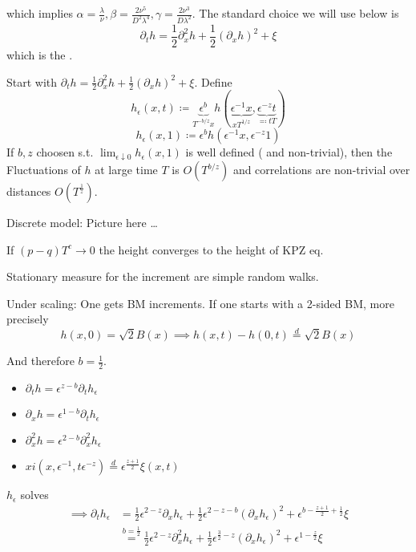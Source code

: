 which implies $\alpha=\frac{\lambda}{\nu},\beta=\frac{2\nu^5}{D^2\lambda^4},\gamma=\frac{2\nu^3}{D\lambda^2}$.
The standard choice we will use below is 
\[\partial_t h = \frac{1}{2}\partial_x^2 h + \frac{1}{2}(\partial_x h)^2+\xi\]
which is the .

Start with $\partial_t h = \frac{1}{2}\partial_x^2 h +\frac{1}{2}(\partial_x h)^2+\xi$. Define 
\[h_\epsilon(x,t)\coloneqq \underbrace{\epsilon^b}_{T^{-b/z}x} h(\underbrace{\epsilon^{-1}x}_{x T^{1/z}},\underbrace{\epsilon^{-z}t}_{\eqqcolon tT})\]
\[h_\epsilon(x,1)\coloneqq \epsilon^b h(\epsilon^{-1}x,\epsilon^{-z}1)\]
If $b,z$ choosen s.t. $\lim_{\epsilon\downarrow 0} h_\epsilon(x,1)$ is well defined ( and non-trivial), then 
the Fluctuations of $h$ at large time $T$ is $O(T^{b/z})$ and correlations are non-trivial over distances $O(T^\frac{1}{z})$.

Discrete model: Picture here \dots 

If $(p-q)T^c\to 0$ the height converges to the height of KPZ eq.

Stationary measure for the increment are simple random walks. 

Under scaling: One gets BM increments. If one starts with a 2-sided BM, more precisely
\[h(x,0)=\sqrt{2}B(x)\implies h(x,t)-h(0,t)\stackrel{d}{=}\sqrt{2}B(x)\]

And therefore $b=\frac{1}{2}$.

\begin{itemize}
    \item $\partial_t h = \epsilon^{z-b}\partial_t h_\epsilon$
    \item $\partial_x h=\epsilon^{1-b}\partial_t h_\epsilon$
    \item $\partial_x^2 h = \epsilon^{2-b}\partial_x^2 h_\epsilon$
    \item $xi(x,\epsilon^{-1},t\epsilon^{-z})\stackrel{d}{=}\epsilon^{\frac{z+1}{2}}\xi(x,t)$
\end{itemize}

$h_\epsilon$ solves
\begin{align*}
    \implies \partial_t h_\epsilon &= \frac{1}{2}\epsilon^{2-z}\partial_x h_\epsilon + \frac{1}{2}\epsilon^{2-z-b}(\partial_x h_\epsilon)^2 + \epsilon^{b-\frac{z+1}{2}+\frac{1}{2}}\xi\\
    &\stackrel{b=\frac{1}{2}}{=}\frac{1}{2}\epsilon^{2-z}\partial_x^2 h_\epsilon + \frac{1}{2}\epsilon^{\frac{3}{2}-z}(\partial_x h_\epsilon)^2+\epsilon^{1-\frac{z}{2}}\xi
\end{align*}

